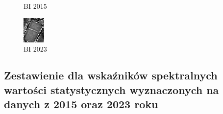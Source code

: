 \documentclass[a4paper,12pt]{article}  %
\begin{document}
\begin{figure}[H]
\begin{minipage}{0.24\textwidth}
        \caption*{BI 2015}
    \end{minipage}
    \begin{minipage}{0.24\textwidth}
        \centering
        \includegraphics[width=\linewidth]{spektralne/bi_budynek3_2023.png}
        \caption*{BI 2023}
    \end{minipage}
\end{figure}

\newpage
\subsection{Zestawienie dla wskaźników spektralnych wartości statystycznych wyznaczonych na danych z 2015 oraz 2023 roku}
\end{document}
